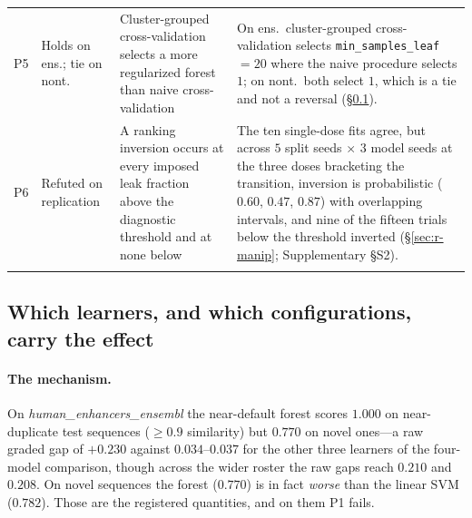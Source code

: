 \documentclass[webpdf,modern,large,namedate]{oup-authoring-template}%
\begin{document}
\begin{table}[tbp]
\begin{center}
\begin{minipage}{\textwidth}
\begin{tabular}{@{}llp{}p{}@{}}
P5 & Holds on ens.; tie on nont. & Cluster-grouped cross-validation selects a more regularized forest than naive cross-validation & On ens.\ cluster-grouped cross-validation selects \texttt{min\_samples\_leaf}$=20$ where the naive procedure selects $1$; on nont.\ both select $1$, which is a tie and not a reversal (\S\ref{sec:r-mech}).\\
P6 & Refuted on replication & A ranking inversion occurs at every imposed leak fraction above the diagnostic threshold and at none below & The ten single-dose fits agree, but across $5$ split seeds $\times$ $3$ model seeds at the three doses bracketing the transition, inversion is probabilistic ($0.60$, $0.47$, $0.87$) with overlapping intervals, and nine of the fifteen trials below the threshold inverted (\S\ref{sec:r-manip}; Supplementary \S S2).\\
\botrule
\end{tabular}
\end{minipage}
\end{center}
\end{table}

\subsection{Which learners, and which configurations, carry the effect}\label{sec:r-mech}
\paragraph{The mechanism.} On \textit{human\_enhancers\_ensembl} the near-default forest scores $1.000$ on near-duplicate test sequences ($\ge0.9$ similarity) but $0.770$ on novel ones---a raw graded gap of $+0.230$ against $0.034$--$0.037$ for the other three learners of the four-model comparison, though across the wider roster the raw gaps reach $0.210$ and $0.208$. On novel sequences the forest ($0.770$) is in fact \emph{worse} than the linear SVM ($0.782$). Those are the registered quantities, and on them P1 fails.
\end{document}
